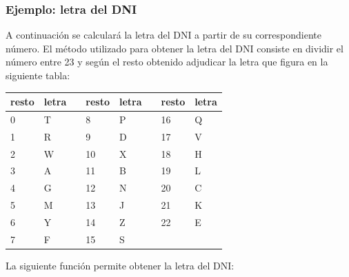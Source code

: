\documentclass[]{book}
\newenvironment{Shaded}{\begin{snugshade}}{\end{snugshade}}
\newcommand{\KeywordTok}[1]{\textcolor[rgb]{0.13,0.29,0.53}{\textbf{#1}}}
\newcommand{\DecValTok}[1]{\textcolor[rgb]{0.00,0.00,0.81}{#1}}
\newcommand{\StringTok}[1]{\textcolor[rgb]{0.31,0.60,0.02}{#1}}
\newcommand{\ControlFlowTok}[1]{\textcolor[rgb]{0.13,0.29,0.53}{\textbf{#1}}}
\newcommand{\OperatorTok}[1]{\textcolor[rgb]{0.81,0.36,0.00}{\textbf{#1}}}
\newcommand{\NormalTok}[1]{#1}
\begin{document}
\subsubsection{Ejemplo: letra del DNI}\label{ejemplo-letra-del-dni}

A continuación se calculará la letra del DNI a partir de su
correspondiente número. El método utilizado para obtener la letra del
DNI consiste en dividir el número entre 23 y según el resto obtenido
adjudicar la letra que figura en la siguiente tabla:

\begin{longtable}[]{@{}llllllll@{}}
\toprule
resto & letra & & resto & letra & & resto & letra\tabularnewline
\midrule
\endhead
0 & T & & 8 & P & & 16 & Q\tabularnewline
1 & R & & 9 & D & & 17 & V\tabularnewline
2 & W & & 10 & X & & 18 & H\tabularnewline
3 & A & & 11 & B & & 19 & L\tabularnewline
4 & G & & 12 & N & & 20 & C\tabularnewline
5 & M & & 13 & J & & 21 & K\tabularnewline
6 & Y & & 14 & Z & & 22 & E\tabularnewline
7 & F & & 15 & S & & &\tabularnewline
\bottomrule
\end{longtable}

La siguiente función permite obtener la letra del DNI:

\begin{Shaded}
\end{Shaded}
\end{document}
